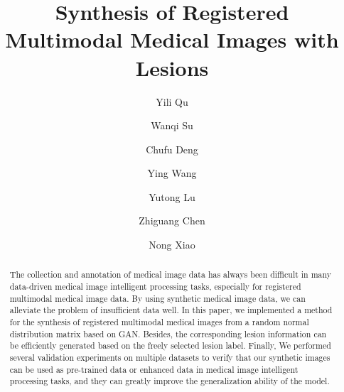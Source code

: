 \documentclass[runningheads]{llncs}
\begin{document}
	\title{Synthesis of Registered Multimodal
		Medical Images with Lesions}
	\author{ Yili Qu \and Wanqi Su \and Chufu Deng \and Ying Wang \\
		\and Yutong Lu \and Zhiguang Chen \and Nong Xiao}
	\maketitle              %
	\begin{abstract}
		The collection and annotation of medical image data has always been difficult in many  data-driven medical image intelligent processing tasks, especially for registered multimodal medical image data. By using synthetic medical image data, we can alleviate the problem of insufficient data well. In this paper, we implemented a method for the synthesis of registered multimodal medical images from a random normal distribution matrix based on GAN. Besides, the corresponding lesion information can be efficiently generated based on the freely selected lesion label. Finally, We performed several validation experiments on multiple datasets to verify that our synthetic images can be used as pre-trained data or enhanced data in medical image intelligent processing tasks, and they can greatly improve the generalization ability of the model.
		
	\end{abstract}
\end{document}
